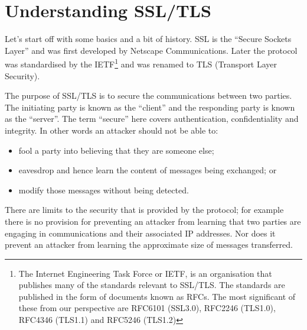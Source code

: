 \chapter{Understanding SSL/TLS}
Let's start off with some basics and a bit of history. SSL is the ``Secure 
Sockets Layer'' and was first developed by Netscape Communications. Later the 
protocol was standardised by the IETF\footnote{The Internet Engineering Task 
Force or IETF, is an organisation that publishes many of the standards relevant 
to SSL/TLS. The standards are published in the form of documents known as RFCs. 
The most significant of these from our perspective are RFC6101 (SSL3.0), 
RFC2246 (TLS1.0), RFC4346 (TLS1.1) and RFC5246 (TLS1.2)} and was renamed to TLS 
(Transport Layer Security).

The purpose of SSL/TLS is to secure the communications between two parties. The
initiating  party is known as the ``client'' and the responding party is known
as the ``server''. The term ``secure'' here covers authentication,
confidentiality and integrity. In other words an attacker should not be able 
to:
\begin{itemize}
\item fool a party into believing that they are someone else;
\item eavesdrop and hence learn the content of messages being exchanged; or
\item modify those messages without being detected.
\end{itemize}

There are limits to the security that is provided by the protocol; for example
there is no  provision for preventing an attacker from learning that two parties
are engaging in communications and their associated IP addresses. Nor does it
prevent an attacker from learning the approximate size of messages transferred.

